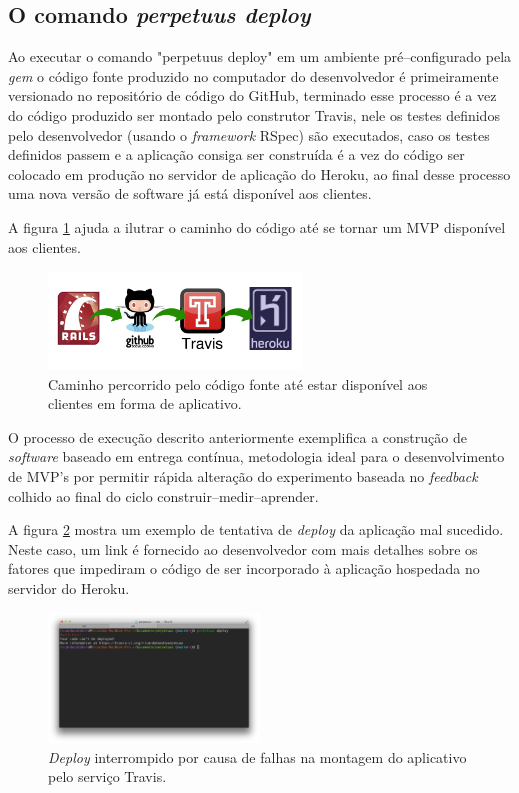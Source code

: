 \pagebreak
\subsection{O comando \emph{perpetuus deploy}}

Ao executar o comando "perpetuus deploy" em um ambiente pr\'e--configurado pela \emph{gem} o c\'odigo fonte produzido no computador do desenvolvedor \'e primeiramente versionado no reposit\'orio de c\'odigo do GitHub, terminado esse processo \'e a vez do c\'odigo produzido ser montado pelo construtor Travis, nele os testes definidos pelo desenvolvedor (usando o \emph{framework} RSpec) s\~ao executados, caso os testes definidos passem e a aplica\c{c}\~ao consiga ser constru\'ida \'e a vez do c\'odigo ser colocado em produ\c{c}\~ao no servidor de aplica\c{c}\~ao do Heroku, ao final desse processo uma nova vers\~ao de software j\'a est\'a dispon\'ivel aos clientes. 

A figura \ref{fig:fig11} ajuda a ilutrar o caminho do c\'odigo at\'e se tornar um MVP dispon\'ivel aos clientes.

\begin{figure}[h]
  \centering
  \includegraphics[width=0.6\textwidth]{./fig/cicloDeploy}
  \caption{Caminho percorrido pelo c\'odigo fonte at\'e estar dispon\'ivel aos clientes em forma de aplicativo.}
  \label{fig:fig11}
\end{figure}

O processo de execu\c{c}\~ao descrito anteriormente exemplifica a constru\c{c}\~ao de \emph{software} baseado em entrega cont\'inua, metodologia ideal para o desenvolvimento de MVP's por permitir r\'apida altera\c{c}\~ao do experimento baseada no \emph{feedback} colhido ao final do ciclo construir--medir--aprender.

\pagebreak

A figura \ref{fig:fig12} mostra um exemplo de tentativa de \emph{deploy} da aplica\c{c}\~ao mal sucedido. Neste caso, um link \'e fornecido ao desenvolvedor com mais detalhes sobre os fatores que impediram o c\'odigo de ser incorporado \`a aplica\c{c}\~ao hospedada no servidor do Heroku.

\begin{figure}[h]
  \centering
  \includegraphics[width=0.5\textwidth]{./fig/deploy1}
  \caption{\emph{Deploy} interrompido por causa de falhas na montagem do aplicativo pelo servi\c{c}o Travis.}
  \label{fig:fig12}
\end{figure}


